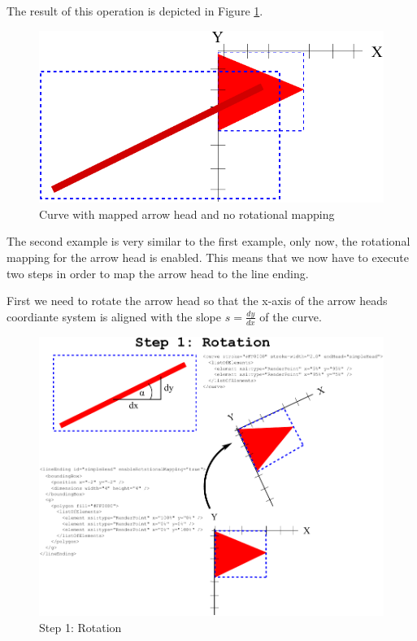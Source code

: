 The result of this operation is depicted in Figure \ref{fig:3ArrowHeadMapping}.

\begin{figure}[!ht]
\begin{center}
\includegraphics[scale=0.25]{figures/ArrowHeadMapping3}
\end{center}
\caption{Curve with mapped arrow head and no rotational mapping} \label{fig:3ArrowHeadMapping}
\end{figure}

The second example is very similar to the first example, only now, the rotational mapping for the arrow head is enabled.
This means that we now have to execute two steps in order to map the arrow head to the line ending.

First we need to rotate the arrow head so that the x-axis of the arrow heads coordiante system is aligned with the slope $s=\frac{dy}{dx}$ of the curve.

\begin{figure}[!ht]
\begin{center}
\includegraphics[scale=0.25]{figures/ArrowHeadMapping6}
\end{center}
\caption{Step 1: Rotation}
\label{ArrowHeadMapping6}
\end{figure}

